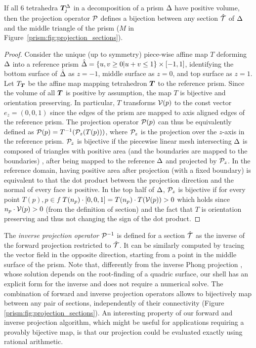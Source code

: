  

\begin{theorem}
If all  6 tetrahedra $\Tet_j^{\Prism}$ in a decomposition of a prism $\Prism$ have positive volume,
then the projection operator $\P$ defines a bijection between any section $\hat{\T}$ of $\Prism$ and the middle triangle of the prism ($M$ in Figure~\ref{prism:fig:projection_sections}).
\label{thm:projection}
\end{theorem}
\begin{proof}
    \label{app:projection}
    Consider the unique (up to symmetry) piece-wise affine map $T$ deforming $\Prism$ into a reference prism $\hat\Prism = \{u,v \geq 0|u+v \leq 1\} \times [-1,1]$, identifying the bottom surface of $\hat\Prism$ as $z=-1$, middle surface as $z=0$, and top surface as $z=1$.
    Let $T_{\Tet}$ be the affine map mapping tetrahedron $\Tet$ to the reference prism.
    Since the volume of all $\Tet$ is positive by assumption, the map $T$ is bijective and orientation preserving. 
    In particular, $T$ transforms $\V(p)$ to the const vector $e_z = (0,0,1)$ since the edges of the prism are mapped to axis aligned edges of the reference prism. The projection operator $\P(p)$ can thus be equivalently defined as $\P(p) = T^{-1}(\P_z(T(p)))$, where $\P_z$ is the projection over the $z$-axis in the reference prism. 
    $\P_z$ is bijective if the piecewise linear mesh intersecting $\Prism$ is composed of triangles with positive area (and the boundaries are mapped to the boundaries) \cite{lipman2014bijective}, after being mapped to the reference $\Prism$ and projected by $\P_z$. In the reference domain, having positive area after projection (with a fixed boundary) is equivalent to that the dot product between the projection direction and the normal of every face is positive. In the top half of $\Prism$, $\P_z$ is bijective if for every point $T(p), p \in f$ $T(n_p)\cdot [0,0,1] = T(n_p) \cdot T(\V(p)) > 0$  which holds since $ n_p \cdot \V(p) > 0$ (from the definition of section) and the fact that $T$ is orientation preserving and thus not changing the sign of the dot product.
\end{proof}

The \emph{inverse projection operator} $\P^{-1}$ is defined for a section $\hat{\T}$ as the inverse of the forward projection
restricted to $\hat{\T}$. %
It can be similarly computed by tracing the vector field in the opposite direction, starting from a point in the middle surface of the prism. Note that, differently from the inverse Phong projection \cite{panozzo2013weighted, kobbelt1998interactive}, whose solution depends on the root-finding of a quadric surface, our shell has an explicit form for the inverse and does not require a numerical solve. The combination of forward and inverse projection operators allows to bijectively map between any pair of sections, independently of their connectivity (Figure \ref{prism:fig:projection_sections}). An interesting property of our forward and inverse projection algorithm, which might be useful for applications requiring a provably bijective map, is that our projection could be evaluated exactly using rational arithmetic.

